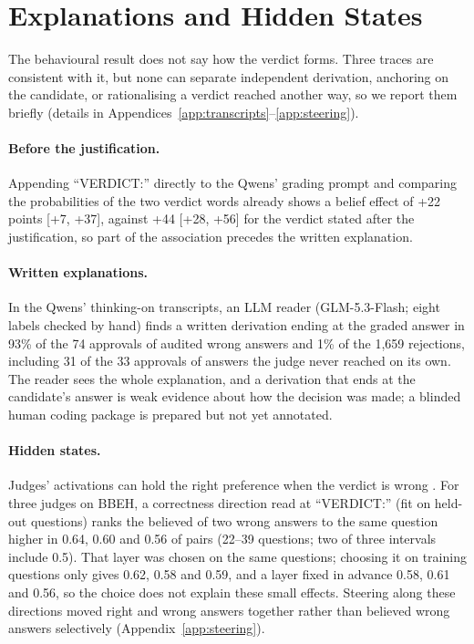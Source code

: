 \documentclass[11pt]{article}
\begin{document}
\section{Explanations and Hidden States}
\label{sec:process}

The behavioural result does not say how the verdict forms. Three traces are consistent with it, but none can
separate independent derivation, anchoring on the candidate, or rationalising a verdict reached another way, so we
report them briefly (details in Appendices~\ref{app:transcripts}--\ref{app:steering}).

\paragraph{Before the justification.}
Appending ``VERDICT:'' directly to the Qwens' grading prompt and comparing the probabilities of the two verdict words
already shows a belief effect of +22 points [+7, +37], against +44 [+28, +56] for the verdict stated after the
justification, so part of the association precedes the written explanation.

\paragraph{Written explanations.}
In the Qwens' thinking-on transcripts, an LLM reader (GLM-5.3-Flash; eight labels checked by hand) finds a written
derivation ending at the graded answer in 93\% of the 74 approvals of audited wrong answers and 1\% of the 1,659
rejections, including 31 of the 33 approvals of answers the judge never reached on its own. The reader sees the
whole explanation, and a derivation that ends at the candidate's answer is weak evidence about how the decision was
made; a blinded human coding package is prepared but not yet annotated.

\paragraph{Hidden states.}
Judges' activations can hold the right preference when the verdict is wrong \citep{mukherjee2026opening}. For three
judges on BBEH, a correctness direction read at ``VERDICT:'' (fit on held-out questions) ranks the believed of two
wrong answers to the same question higher in 0.64, 0.60 and 0.56 of pairs (22--39 questions; two of three intervals include 0.5). That layer was chosen on the same questions; choosing it on training questions only gives 0.62,
0.58 and 0.59, and a layer fixed in advance 0.58, 0.61 and 0.56, so the choice does not explain these small effects. Steering along these directions
\citep{rimsky-etal-2024-steering} moved right and wrong answers together rather than believed wrong answers
selectively (Appendix~\ref{app:steering}).
\end{document}
